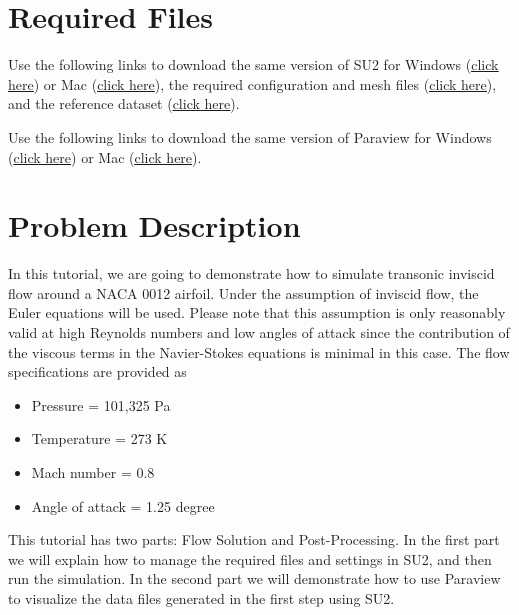 \section{Required Files}
\begin{su2note}
	Use the following links to download the same version of SU2 for Windows (\href{https://users.encs.concordia.ca/~bvermeir/book/executables/windows/SU2_Windows.zip}{\underline{click here}}) or Mac (\href{https://users.encs.concordia.ca/~bvermeir/book/executables/osx/SU2_Mac.zip}{\underline{click here}}), the required configuration and mesh files (\href{https://gitlab.com/bvermeir/book-cfd/blob/master/tutorial/tut1_inviscid_naca0012/naca0012.zip}{\underline{click here}}), and the reference dataset (\href{https://gitlab.com/bvermeir/book-cfd/blob/master/tutorial/tut1_inviscid_naca0012/experimental_values.zip}{\underline{click here}}).
\end{su2note}
\begin{paraviewnote}
	Use the following links to download the same version of Paraview for Windows (\href{https://users.encs.concordia.ca/~bvermeir/book/executables/windows/ParaView-5.4.0-Qt5-OpenGL2-Windows-64bit.exe}{\underline{click here}}) or Mac (\href{https://users.encs.concordia.ca/~bvermeir/book/executables/osx/ParaView-5.4.0-Qt5-OpenGL2-MPI-OSX10.8-64bit.dmg}{\underline{click here}}).
\end{paraviewnote}

\section{Problem Description}
In this tutorial, we are going to demonstrate how to simulate transonic inviscid flow around a NACA 0012 airfoil. Under the assumption of inviscid flow, the Euler equations will be used. Please note that this assumption is only reasonably valid at high Reynolds numbers and low angles of attack since the contribution of the viscous terms in the Navier-Stokes equations is minimal in this case. The flow specifications are provided as
\begin{itemize}
    \item Pressure = 101,325 Pa
    \item Temperature = 273 K
    \item Mach number = 0.8
    \item Angle of attack = 1.25 degree
\end{itemize}
This tutorial has two parts: Flow Solution and Post-Processing. In the first part we will explain how to manage the required files and settings in SU2, and then run the simulation. In the second part we will demonstrate how to use Paraview to visualize the data files generated in the first step using SU2.
